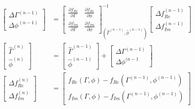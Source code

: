 \documentclass[draftcls,onecolumn]{IEEEtran}  %
\begin{document}
\begin{align}
 \begin{bmatrix} \Delta \Gamma^{(n-1)} \\ \Delta \phi^{(n-1)} \end{bmatrix} &=
 \begin{bmatrix}
        \frac{\partial f_{Re}}{\partial \Gamma}      &  \frac{\partial f_{Re}}{\partial \phi}  \\
        \frac{\partial f_{Im}}{\partial \Gamma}      &  \frac{\partial f_{Im}}{\partial \phi}  
    \end{bmatrix} ^{-1} _{(\hat{\Gamma}^{(n-1)} ,\hat{\phi}^{(n-1)})}
    \begin{bmatrix} \Delta f_{Re}^{(n-1)} \\ \Delta f_{Im}^{(n-1)} \end{bmatrix} \\
\begin{bmatrix} \hat{\Gamma}^{(n)} \\ \hat{\phi}^{(n)} \end{bmatrix}  &= 
\begin{bmatrix} \hat{\Gamma}^{(n-1)} \\ \hat{\phi}^{(n-1)} \end{bmatrix}  + \begin{bmatrix} \Delta \Gamma^{(n-1)} \\ \Delta \phi^{(n-1} \end{bmatrix} \\
\begin{bmatrix} \Delta f_{Re}^{(n)} \\ \Delta f_{Im}^{(n)} \end{bmatrix} &= 
\begin{bmatrix} f_{Re}(\Gamma, \phi) -  f_{Re}(\Gamma^{(n-1)}, \phi^{(n-1)})\\ f_{Im}(\Gamma, \phi) -  f_{Im}(\Gamma^{(n-1)}, \phi^{(n-1)})\end{bmatrix}
\label{Eq: LQS3}
\end{align}
\end{document}
